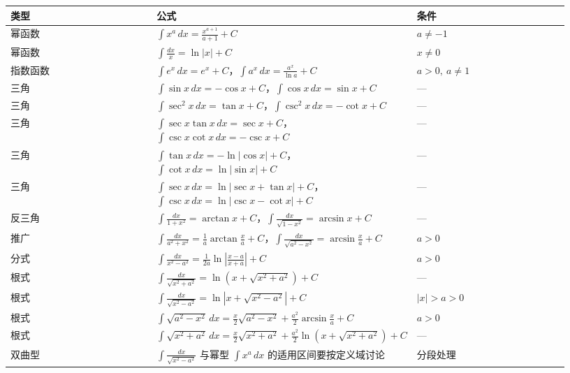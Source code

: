 \documentclass[11pt,openany,UTF8]{ctexbook}
\begin{document}
\begingroup\small\setlength{\tabcolsep}{4.0pt}
\begin{longtable}{@{}L{0.3095\linewidth}L{0.3095\linewidth}L{0.3095\linewidth}@{}}
\toprule
\textbf{类型} & \textbf{公式} & \textbf{条件} \\
\midrule
\endhead
幂函数 & $\displaystyle\int x^{a}\,dx=\frac{x^{a+1}}{a+1}+C$ & $a\neq -1$ \\
幂函数 & $\displaystyle\int \frac{dx}{x}=\ln\lvert x\rvert+C$ & $x\neq 0$ \\
指数函数 & $\displaystyle\int e^{x}\,dx=e^{x}+C$，$\displaystyle\int a^{x}\,dx=\frac{a^{x}}{\ln a}+C$ & $a>0,\allowbreak\ a\neq 1$ \\
三角 & $\displaystyle\int \sin x\,dx=-\cos x+C$，$\displaystyle\int \cos x\,dx=\sin x+C$ & — \\
三角 & $\displaystyle\int \sec^2x\,dx=\tan x+C$，$\displaystyle\int \csc^2x\,dx=-\cot x+C$ & — \\
三角 & $\displaystyle\int \sec x\tan x\,dx=\sec x+C$，$\displaystyle\int \csc x\cot x\,dx=-\csc x+C$ & — \\
三角 & $\displaystyle\int \tan x\,dx=-\ln\lvert \cos x\rvert+C$，$\displaystyle\int \cot x\,dx=\ln\lvert \sin x\rvert+C$ & — \\
三角 & $\displaystyle\int \sec x\,dx=\ln\lvert \sec x+\tan x\rvert+C$，$\displaystyle\int \csc x\,dx=\ln\lvert \csc x-\cot x\rvert+C$ & — \\
反三角 & $\displaystyle\int \frac{dx}{1+x^2}=\arctan x+C$，$\displaystyle\int \frac{dx}{\sqrt{1-x^2}}=\arcsin x+C$ & — \\
推广 & $\displaystyle\int \frac{dx}{a^2+x^2}=\frac{1}{a}\arctan\frac{x}{a}+C$，$\displaystyle\int \frac{dx}{\sqrt{a^2-x^2}}=\arcsin\frac{x}{a}+C$ & $a>0$ \\
分式 & $\displaystyle\int \frac{dx}{x^2-a^2}=\frac{1}{2a}\ln\left\lvert\frac{x-a}{x+a}\right\rvert+C$ & $a>0$ \\
根式 & $\displaystyle\int \frac{dx}{\sqrt{x^2+a^2}}=\ln\left(x+\sqrt{x^2+a^2}\right)+C$ & — \\
根式 & $\displaystyle\int \frac{dx}{\sqrt{x^2-a^2}}=\ln\left\lvert x+\sqrt{x^2-a^2}\right\rvert+C$ & $\lvert x\rvert>a>0$ \\
根式 & $\displaystyle\int \sqrt{a^2-x^2}\,dx=\frac{x}{2}\sqrt{a^2-x^2}+\frac{a^2}{2}\arcsin\frac{x}{a}+C$ & $a>0$ \\
根式 & $\displaystyle\int \sqrt{x^2+a^2}\,dx=\frac{x}{2}\sqrt{x^2+a^2}+\frac{a^2}{2}\ln\left(x+\sqrt{x^2+a^2}\right)+C$ & — \\
双曲型 & $\displaystyle\int \frac{dx}{\sqrt{x^2-a^2}}$ 与幂型 $\displaystyle\int x^{a}\,dx$ 的适用区间要按定义域讨论 & 分段处理 \\
\bottomrule
\end{longtable}
\endgroup
\end{document}
